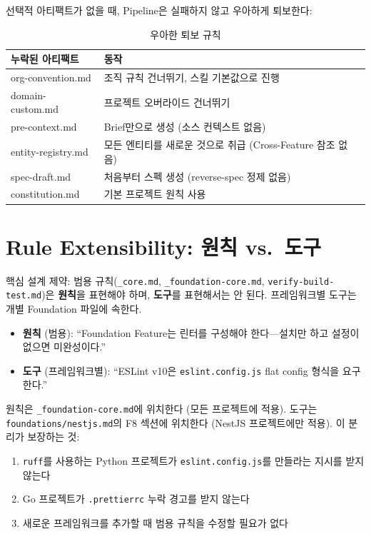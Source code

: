 \documentclass[11pt,a4paper,openright,twoside]{report}
\newcommand{\file}[1]{\texttt{#1}}
\begin{document}
선택적 아티팩트가 없을 때, Pipeline은 실패하지 않고 우아하게 퇴보한다:

\begin{table}[H]
\centering
\caption{우아한 퇴보 규칙}
\label{tab:degradation}
\begin{tabularx}{\textwidth}{lX}
\toprule
\textbf{누락된 아티팩트} & \textbf{동작} \\
\midrule
org-convention.md & 조직 규칙 건너뛰기, 스킬 기본값으로 진행 \\
domain-custom.md & 프로젝트 오버라이드 건너뛰기 \\
pre-context.md & Brief만으로 생성 (소스 컨텍스트 없음) \\
entity-registry.md & 모든 엔티티를 새로운 것으로 취급 (Cross-Feature 참조 없음) \\
spec-draft.md & 처음부터 스펙 생성 (reverse-spec 정제 없음) \\
constitution.md & 기본 프로젝트 원칙 사용 \\
\bottomrule
\end{tabularx}
\end{table}


\section{Rule Extensibility: 원칙 vs.\ 도구}
\label{sec:rule-extensibility}

핵심 설계 제약: 범용 규칙(\file{\_core.md}, \file{\_foundation-core.md}, \file{verify-build-test.md})은 \textbf{원칙}을 표현해야 하며, \textbf{도구}를 표현해서는 안 된다. 프레임워크별 도구는 개별 Foundation 파일에 속한다.

\begin{itemize}[nosep]
  \item \textbf{원칙} (범용): ``Foundation Feature는 린터를 구성해야 한다---설치만 하고 설정이 없으면 미완성이다.''
  \item \textbf{도구} (프레임워크별): ``ESLint v10은 \texttt{eslint.config.js} flat config 형식을 요구한다.''
\end{itemize}

원칙은 \file{\_foundation-core.md}에 위치한다 (모든 프로젝트에 적용). 도구는 \file{foundations/nestjs.md}의 F8 섹션에 위치한다 (NestJS 프로젝트에만 적용). 이 분리가 보장하는 것:

\begin{enumerate}[nosep]
  \item \texttt{ruff}를 사용하는 Python 프로젝트가 \texttt{eslint.config.js}를 만들라는 지시를 받지 않는다
  \item Go 프로젝트가 \texttt{.prettierrc} 누락 경고를 받지 않는다
  \item 새로운 프레임워크를 추가할 때 범용 규칙을 수정할 필요가 없다
\end{enumerate}
\end{document}
